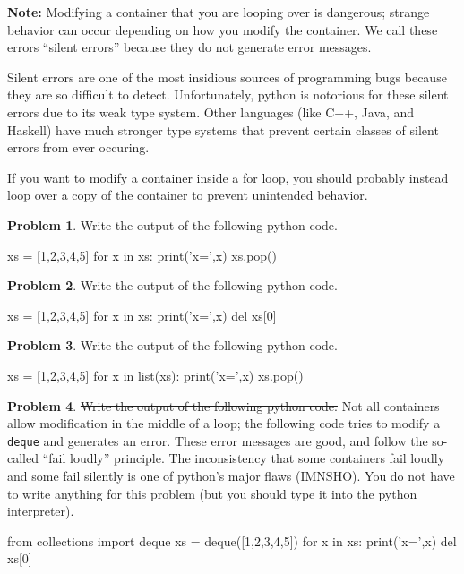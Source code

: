 \documentclass[12pt]{article}
\theoremstyle{definition}
\newtheorem{problem}{Problem}
\begin{document}
\newpage
\noindent
\textbf{Note:}
Modifying a container that you are looping over is dangerous;
strange behavior can occur depending on how you modify the container.
We call these errors ``silent errors'' because they do not generate error messages.

Silent errors are one of the most insidious sources of programming bugs because they are so difficult to detect.
Unfortunately, python is notorious for these silent errors due to its weak type system.
Other languages (like C++, Java, and Haskell) have much stronger type systems that prevent certain classes of silent errors from ever occuring.

If you want to modify a container inside a for loop,
you should probably instead loop over a copy of the container to prevent unintended behavior.

\begin{problem}
Write the output of the following python code.
\begin{python}
xs = [1,2,3,4,5]
for x in xs:
    print('x=',x)
    xs.pop()
\end{python}
\end{problem}
\vspace{2in}

\begin{problem}
Write the output of the following python code.
\begin{python}
xs = [1,2,3,4,5]
for x in xs:
    print('x=',x)
    del xs[0]
\end{python}
\end{problem}
\vspace{2in}

\newpage
\begin{problem}
Write the output of the following python code.
\begin{python}
xs = [1,2,3,4,5]
for x in list(xs):
    print('x=',x)
    xs.pop()
\end{python}
\end{problem}
\vspace{2in}

\begin{problem}
\sout{Write the output of the following python code.}
Not all containers allow modification in the middle of a loop;
the following code tries to modify a \texttt{deque} and generates an error.
These error messages are good, and follow the so-called ``fail loudly'' principle.
The inconsistency that some containers fail loudly and some fail silently is one of python's major flaws (IMNSHO).
You do not have to write anything for this problem (but you should type it into the python interpreter).

\begin{python}
from collections import deque
xs = deque([1,2,3,4,5])
for x in xs:
    print('x=',x)
    del xs[0]
\end{python}
\end{problem}
\vspace{2in}
\end{document}
